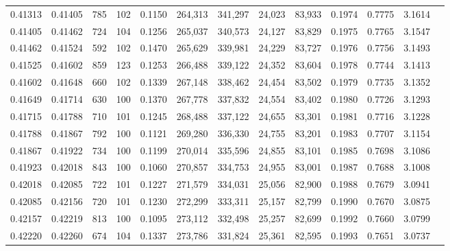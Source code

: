 \begin{tabular}{rrrrrrrrrrrrr}
0.41313 & 0.41405 &   785 & 102 &                                     0.1150 & 264,313 & 341,297 &  24,023 &  83,933 & 0.1974 & 0.7775 & 3.1614 \\
0.41405 & 0.41462 &   724 & 104 &                                     0.1256 & 265,037 & 340,573 &  24,127 &  83,829 & 0.1975 & 0.7765 & 3.1547 \\
0.41462 & 0.41524 &   592 & 102 &                                     0.1470 & 265,629 & 339,981 &  24,229 &  83,727 & 0.1976 & 0.7756 & 3.1493 \\
0.41525 & 0.41602 &   859 & 123 &                                     0.1253 & 266,488 & 339,122 &  24,352 &  83,604 & 0.1978 & 0.7744 & 3.1413 \\
0.41602 & 0.41648 &   660 & 102 &                                     0.1339 & 267,148 & 338,462 &  24,454 &  83,502 & 0.1979 & 0.7735 & 3.1352 \\
0.41649 & 0.41714 &   630 & 100 &                                     0.1370 & 267,778 & 337,832 &  24,554 &  83,402 & 0.1980 & 0.7726 & 3.1293 \\
0.41715 & 0.41788 &   710 & 101 &                                     0.1245 & 268,488 & 337,122 &  24,655 &  83,301 & 0.1981 & 0.7716 & 3.1228 \\
0.41788 & 0.41867 &   792 & 100 &                                     0.1121 & 269,280 & 336,330 &  24,755 &  83,201 & 0.1983 & 0.7707 & 3.1154 \\
0.41867 & 0.41922 &   734 & 100 &                                     0.1199 & 270,014 & 335,596 &  24,855 &  83,101 & 0.1985 & 0.7698 & 3.1086 \\
0.41923 & 0.42018 &   843 & 100 &                                     0.1060 & 270,857 & 334,753 &  24,955 &  83,001 & 0.1987 & 0.7688 & 3.1008 \\
0.42018 & 0.42085 &   722 & 101 &                                     0.1227 & 271,579 & 334,031 &  25,056 &  82,900 & 0.1988 & 0.7679 & 3.0941 \\
0.42085 & 0.42156 &   720 & 101 &                                     0.1230 & 272,299 & 333,311 &  25,157 &  82,799 & 0.1990 & 0.7670 & 3.0875 \\
0.42157 & 0.42219 &   813 & 100 &                                     0.1095 & 273,112 & 332,498 &  25,257 &  82,699 & 0.1992 & 0.7660 & 3.0799 \\
0.42220 & 0.42260 &   674 & 104 &                                     0.1337 & 273,786 & 331,824 &  25,361 &  82,595 & 0.1993 & 0.7651 & 3.0737 \\

\end{tabular}
